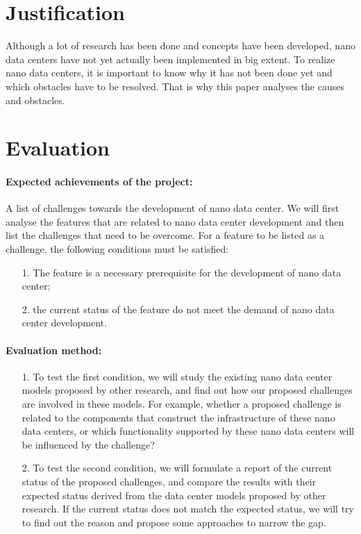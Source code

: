 \documentclass[sigchi-a, authorversion]{acmart}
\begin{document}
\section{Justification} %
Although a lot of research has been done and concepts have been developed, nano data centers have not yet actually been implemented in big extent. To realize nano data centers, it is important to know why it has not been done yet and which obstacles have to be resolved. That is why this paper analyses the causes and obstacles.

\section{Evaluation} %

\paragraph{Expected achievements of the project:} A list of challenges towards the development of nano data center.
We will first analyse the features that are related to nano data center development and then list the challenges that need to be overcome. 
For a feature to be listed as a challenge, 
the following conditions must be satisfied:
\begin{enumerate}
\item[1.] The feature is a necessary prerequisite for the development of nano data center;
\item[2.] the current status of the feature do not meet the demand of nano data center development. 
\end{enumerate}

\paragraph{Evaluation method:} 
\begin{enumerate}
\item[1.] To test the first condition, 
we will study the existing nano data center models proposed by other research, 
and find out how our proposed challenges are involved in these models. 
For example, whether a proposed challenge is related to the components that construct the infrastructure of these nano data centers,
or which functionality supported by these nano data centers will be influenced by the challenge?
\item[2.] To test the second condition,
we will formulate a report of the current status of the proposed challenges,
and compare the results with their expected status derived from the data center models proposed by other research.
If the current status does not match the expected status,
we will try to find out the reason and propose some approaches to narrow the gap.
\end{enumerate}
\end{document}
